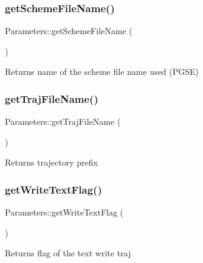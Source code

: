 \subsubsection{\texorpdfstring{get\+Scheme\+File\+Name()}{getSchemeFileName()}}
{\footnotesize\ttfamily Parameters\+::get\+Scheme\+File\+Name (\begin{DoxyParamCaption}{ }\end{DoxyParamCaption})}

\begin{DoxyReturn}{Returns}
name of the scheme file name used (P\+G\+SE) 
\end{DoxyReturn}
\mbox{\label{class_parameters_a38057c2ae3d11b578c8f199d73683ee1}} 
\subsubsection{\texorpdfstring{get\+Traj\+File\+Name()}{getTrajFileName()}}
{\footnotesize\ttfamily Parameters\+::get\+Traj\+File\+Name (\begin{DoxyParamCaption}{ }\end{DoxyParamCaption})}

\begin{DoxyReturn}{Returns}
trajectory prefix 
\end{DoxyReturn}
\mbox{\label{class_parameters_adb6064f329732640c226608d6e1ddb60}} 
\subsubsection{\texorpdfstring{get\+Write\+Text\+Flag()}{getWriteTextFlag()}}
{\footnotesize\ttfamily Parameters\+::get\+Write\+Text\+Flag (\begin{DoxyParamCaption}{ }\end{DoxyParamCaption})}

\begin{DoxyReturn}{Returns}
flag of the text write traj 
\end{DoxyReturn}
\mbox{\label{class_parameters_a21817e9a0207da2adf32611bcaf889ef}} 
